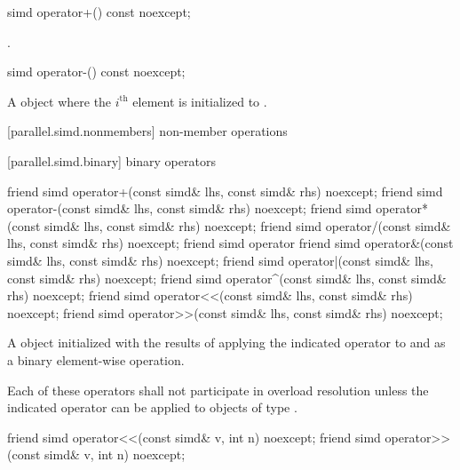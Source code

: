 \begin{itemdecl}
simd operator+() const noexcept;
\end{itemdecl}

\begin{itemdescr}
  \pnum\returns
  .
\end{itemdescr}

\begin{itemdecl}
simd operator-() const noexcept;
\end{itemdecl}

\begin{itemdescr}
  \pnum\returns
  A  object where the $i^\text{th}$ element is initialized to  \foralli.
\end{itemdescr}

[parallel.simd.nonmembers]{ non-member operations}

[parallel.simd.binary]{ binary operators}

\begin{itemdecl}
friend simd operator+(const simd& lhs, const simd& rhs) noexcept;
friend simd operator-(const simd& lhs, const simd& rhs) noexcept;
friend simd operator*(const simd& lhs, const simd& rhs) noexcept;
friend simd operator/(const simd& lhs, const simd& rhs) noexcept;
friend simd operator%
friend simd operator&(const simd& lhs, const simd& rhs) noexcept;
friend simd operator|(const simd& lhs, const simd& rhs) noexcept;
friend simd operator^(const simd& lhs, const simd& rhs) noexcept;
friend simd operator<<(const simd& lhs, const simd& rhs) noexcept;
friend simd operator>>(const simd& lhs, const simd& rhs) noexcept;
\end{itemdecl}

\begin{itemdescr}
  \pnum\returns
  A  object initialized with the results of applying the indicated operator to  and  as a binary element-wise operation.

  \pnum\remarks
  Each of these operators shall not participate in overload resolution unless the indicated operator can be applied to objects of type .
\end{itemdescr}

\begin{itemdecl}
friend simd operator<<(const simd& v, int n) noexcept;
friend simd operator>>(const simd& v, int n) noexcept;
\end{itemdecl}

